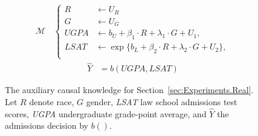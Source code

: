 %
\begin{figure}[t]
\begin{minipage}{.35\linewidth}
\begin{figure}[H]
\centering
\end{figure}
\end{minipage}
\begin{minipage}{.55\linewidth}
\begin{align*}
\mathcal{M} \, & 
\begin{cases}
    R & \leftarrow U_{R}\\
    G & \leftarrow U_G \\
    UGPA & \leftarrow b_U + \beta_1 \cdot R + \lambda_1 \cdot G + U_1, \ \\
    LSAT & \leftarrow  \exp\{b_L + \beta_2 \cdot R + \lambda_2 \cdot G + U_2\}, \\
\end{cases}
\end{align*}
\begin{align*}
    \widehat{Y} & = b(UGPA, LSAT) 
\end{align*}
\end{minipage}
\caption{The auxiliary causal knowledge for Section~\ref{sec:Experiments.Real}. Let $R$ denote race, $G$ gender, \textit{LSAT} law school admissions test scores, \textit{UGPA} undergraduate grade-point average, and $\hat{Y}$ the admissions decision by $b()$.}
\label{fig:LawSchool}
\end{figure}
%


